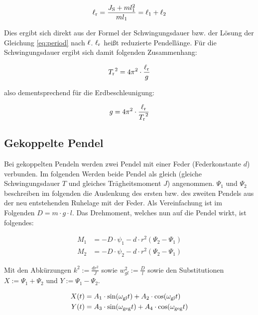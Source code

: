 \begin{equation*}
\ell_{\mathrm{r}} = \frac{J_{\mathrm{S}}+ml^2_1}{ml_1} = \ell_1 + \ell_2
\end{equation*}

Dies ergibt sich direkt aus der Formel der Schwingungsdauer bzw. der Lösung der Gleichung \ref{eq:period} nach $\ell$. $\ell_{\mathrm{r}}$ heißt reduzierte Pendellänge. Für die Schwingungsdauer ergibt sich damit folgenden Zusammenhang:

\begin{equation*}
{T_\mathrm{r}}^2 = 4\pi^2 \cdot \frac{\ell_{\mathrm{r}}}{g}
\end{equation*}

also dementsprechend für die Erdbeschleunigung:

\begin{equation}
g = 4\pi^2 \cdot \frac{\ell_{\mathrm{r}}}{{T_\mathrm{r}}^2}
\label{eq:gravity}
\end{equation}

\subsection{Gekoppelte Pendel}
Bei gekoppelten Pendeln werden zwei Pendel mit einer Feder (Federkonstante $d$) verbunden. Im folgenden Werden beide Pendel als gleich (gleiche Schwingungsdauer $T$ und gleiches Trägheitsmoment $J$) angenommen. $\Psi_1$ und $\Psi_2$ beschreiben im folgenden die Auslenkung des ersten bzw. des zweiten Pendels aus der neu entstehenden Ruhelage mit der Feder. Als Vereinfachung ist im Folgenden $D = m \cdot g \cdot l$. Das Drehmoment, welches nun auf die Pendel wirkt, ist folgendes:

\begin{align}
M_1 &= -D \cdot \psi_1 - d \cdot r^2(\Psi_2 - \Psi_1)   \label{eq:drehmoment1} \\
M_2 &= -D \cdot \psi_2 - d \cdot r^2(\Psi_2 - \Psi_1)   \label{eq:drehmoment2}
\end{align}

Mit den Abkürzungen $k^2 := \frac{dr^2}{J}$ sowie $w_{gl}^2 := \frac{D}{l}$ sowie den Substitutionen $X := \Psi_1 + \Psi_2$ und $Y := \Psi_1 - \Psi_2$.

\begin{align}
X(t) &= A_1 \cdot \sin (\omega_{\mathrm{gl}}t) + A_2 \cdot \cos (\omega_{\mathrm{gl}}t)		\label{eq:subst1} \\
Y(t) &= A_3 \cdot \sin (\omega_{\mathrm{geg}}t) + A_4 \cdot \cos (\omega_{\mathrm{geg}}t) 	\label{eq:subst2}
\end{align}

